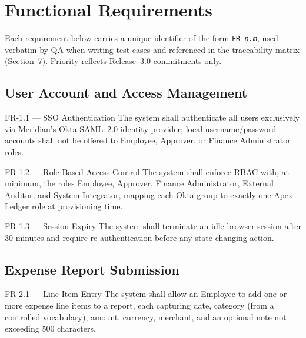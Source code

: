 \section{Functional Requirements}

Each requirement below carries a unique identifier of the form \texttt{FR-\emph{n.m}}, used
verbatim by QA when writing test cases and referenced in the traceability matrix
(Section~7). Priority reflects Release~3.0 commitments only.

\subsection{User Account and Access Management}

\begin{reqbox}{FR-1.1 --- SSO Authentication}
The system shall authenticate all users exclusively via Meridian's Okta SAML~2.0 identity
provider; local username/password accounts shall not be offered to Employee, Approver, or
Finance Administrator roles. \hfill \priohigh
\end{reqbox}

\begin{reqbox}{FR-1.2 --- Role-Based Access Control}
The system shall enforce RBAC with, at minimum, the roles Employee, Approver, Finance
Administrator, External Auditor, and System Integrator, mapping each Okta group to exactly one
Apex Ledger role at provisioning time. \hfill \priohigh
\end{reqbox}

\begin{reqbox}{FR-1.3 --- Session Expiry}
The system shall terminate an idle browser session after 30 minutes and require
re-authentication before any state-changing action. \hfill \priomed
\end{reqbox}

\subsection{Expense Report Submission}

\begin{reqbox}{FR-2.1 --- Line-Item Entry}
The system shall allow an Employee to add one or more expense line items to a report, each
capturing date, category (from a controlled vocabulary), amount, currency, merchant, and an
optional note not exceeding 500 characters. \hfill \priohigh
\end{reqbox}

